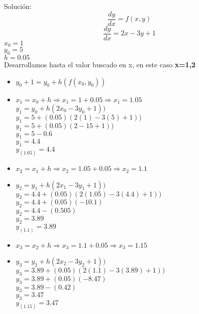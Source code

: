 \documentclass[12 pt,letterpaper]{article}
\begin{document}
	Solución:
	\begin{equation}
		\frac{dy}{dx}=f(x,y)
	\end{equation}
	\begin{equation}
		\frac{dy}{dx}=2x-3y+1
	\end{equation}
	$x_{0}=1$\\
	$y_{0}=5$\\
	$h=0.05$\\
	\vspace{4mm} %
	Desarrollamos hasta el valor buscado en x, en este caso \textbf {x=1,2}\\
	\vspace{4mm} %
	\begin{itemize}
		\item\textbf{$y_{0}+1=y_{0}+h(f(x_{0},y_{0}))$}\\
		\item\textbf{$x_{1}=x_{0}+h  \Rightarrow x_{1}=1+0.05\Rightarrow x_{1}=1.05 $} \\
		{$y_{1}=y_{0}+h(2x_{0}-3y_{0}+1))$}\\
		{$y_{1}=5+(0.05)(2(1)-3(5)+1))$}\\
		{$y_{1}=5+(0.05)(2-15+1))$}\\
		{$y_{1}=5-0.6$}\\
		{$y_{1}=4.4$}\\
		\textbf{$y_{(1.05)}=4.4$}\\
	\end{itemize}
	\vspace{0.8mm} %
	\begin{itemize}
		\item\textbf{$x_{2}=x_{1}+h  \Rightarrow x_{2}=1.05+0.05\Rightarrow x_{2}=1.1 $} \\
		\item\textbf{$y_{2}=y_{1}+h(2x_{1}-3y_{1}+1))$}\\
		{$y_{2}=4.4+(0.05)(2(1.05)-3(4.4)+1))$}\\
		{$y_{2}=4.4+(0.05)(-10.1)$}\\
		{$y_{2}=4.4-(0.505)$}\\
		{$y_{2}=3.89$}\\
		\textbf{$y_{(1.1)}=3.89$}\\
	\end{itemize}
	\vspace{0.5mm} %
	\begin{itemize}
		\item\textbf{$x_{3}=x_{2}+h  \Rightarrow x_{3}=1.1+0.05\Rightarrow x_{3}=1.15 $} \\
		\item\textbf{$y_{3}=y_{2}+h(2x_{2}-3y_{2}+1))$}\\
		{$y_{3}=3.89+(0.05)(2(1.1)-3(3.89)+1))$}\\
		{$y_{3}=3.89+(0.05)(-8.47)$}\\
		{$y_{3}=3.89-(0.42)$}\\
		{$y_{3}=3.47$}\\
		\textbf{$y_{(1.15)}=3.47$}\\
	\end{itemize}
\end{document}
